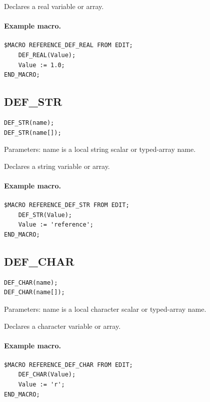\documentclass[a4paper,10pt,twoside,openany]{book}
\begin{document}
Declares a real variable or array.

\paragraph{Example macro.}
\begin{verbatim}
$MACRO REFERENCE_DEF_REAL FROM EDIT;
    DEF_REAL(Value);
    Value := 1.0;
END_MACRO;
\end{verbatim}

\label{prim:keyword-def-str}
\subsection*{DEF\_STR}
\begin{verbatim}
DEF_STR(name);
DEF_STR(name[]);
\end{verbatim}
Parameters: name is a local string scalar or typed-array name.

Declares a string variable or array.

\paragraph{Example macro.}
\begin{verbatim}
$MACRO REFERENCE_DEF_STR FROM EDIT;
    DEF_STR(Value);
    Value := 'reference';
END_MACRO;
\end{verbatim}

\label{prim:keyword-def-char}
\subsection*{DEF\_CHAR}
\begin{verbatim}
DEF_CHAR(name);
DEF_CHAR(name[]);
\end{verbatim}
Parameters: name is a local character scalar or typed-array name.

Declares a character variable or array.

\paragraph{Example macro.}
\begin{verbatim}
$MACRO REFERENCE_DEF_CHAR FROM EDIT;
    DEF_CHAR(Value);
    Value := 'r';
END_MACRO;
\end{verbatim}
\end{document}
